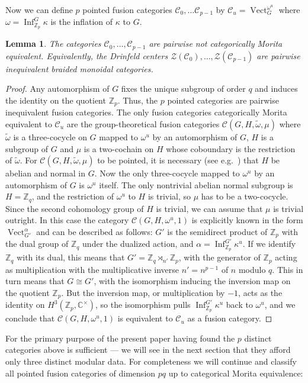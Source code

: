 \documentclass[12pt]{amsart}
\newtheorem{Lem}[Thm]{Lemma}
\theoremstyle{remark}
\theoremstyle{definition}
\numberwithin{equation}{section}
\newcommand\Vect{\operatorname{Vect}}
\newcommand\CC{\mathbb C}
\newcommand\ZZ{\mathbb Z}
\newcommand\C{\mathcal C}
\newcommand\CTR{\mathcal Z}
\newcommand\semidir\rtimes
\newcommand\Inf{\operatorname{Inf}}
\begin{document}
Now we can define $p$ pointed fusion categories $\C_0,\dots\C_{p-1}$ by $\C_u=\Vect_G^{\omega^u}$ where $\omega=\Inf_{\ZZ_p}^G\kappa$ is the inflation of $\kappa$ to $G$.
\begin{Lem}\label{Lem:pStueck}
  The categories $\C_0,\dots,\C_{p-1}$ are pairwise not categorically Morita equivalent. Equivalently, the Drinfeld centers $\CTR(\C_0),\dots,\CTR(\C_{p-1})$ are pairwise inequivalent braided monoidal categories.
\end{Lem}
\begin{proof}
  Any automorphism of $G$ fixes the unique subgroup of order $q$ and induces the identity on the quotient $\ZZ_p$. Thus, the $p$ pointed categories are pairwise inequivalent fusion categories. The only fusion categories categorically Morita equivalent to $\C_u$ are the group-theoretical fusion categories $\C(G,H,\widetilde\omega,\mu)$ where $\widetilde\omega$ is a three-cocycle on $G$ mapped to $\omega^u$ by an automorphism of $G$, $H$ is a subgroup of $G$ and $\mu$ is a two-cochain on $H$ whose coboundary is the restriction of $\widetilde\omega$. For $\C(G,H,\widetilde\omega,\mu)$ to be pointed, it is necessary (see e.g.~\cite{MR2362670}) that $H$ be abelian and normal in $G$. Now the only three-cocycle mapped to $\omega^u$ by an automorphism of $G$ is $\omega^u$ itself. The only nontrivial abelian normal subgroup is $H=\ZZ_q$, and the restriction of $\omega^u$ to $H$ is trivial, so $\mu$ has to be a two-cocycle. Since the second cohomology group of $H$ is trivial, we can assume that $\mu$ is trivial outright. In this case the category $\C(G,H,\omega^u,1)$ is explicitly known \cite[Thm.2.1]{MR2333187} in the form $\Vect_{G'}^\alpha$ and can be described as follows: $G'$ is the semidirect product of $\ZZ_p$ with the dual group of $\ZZ_q$ under the dualized action, and $\alpha=\Inf_{\ZZ_p}^{G'}\kappa^u$. If we identify $\ZZ_q$ with its dual, this means that $G'=\ZZ_q\semidir_{n'}\ZZ_p$, with the generator of $\ZZ_p$ acting as multiplication with the multiplicative inverse $n'=n^{p-1}$ of $n$ modulo $q$. This in turn means that $G\cong G'$, with the isomorphism inducing the inversion map on the quotient $\ZZ_p$. But the inversion map, or multiplication by $-1$, acts as the identity on $H^3(\ZZ_p,\CC^\times)$, so the isomorphism pulls $\Inf_{\ZZ_p}^{G'}\kappa^u$ back to $\omega^u$, and we conclude that $\C(G,H,\omega^u,1)$ is equivalent to $\C_u$ as a fusion category.
\end{proof}

For the primary purpose of the present paper having found the $p$ distinct categories above is sufficient --- we will see in the next section that they afford only three distinct modular data. For completeness we will continue and classify all pointed fusion categories of dimension $pq$ up to categorical Morita equivalence:
\end{document}
